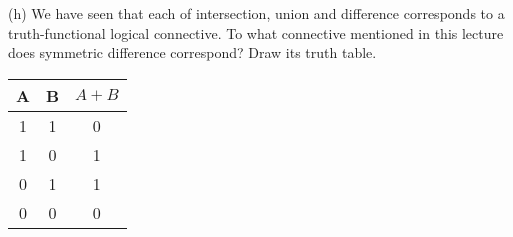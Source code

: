 \documentclass{article}
\begin{document}
(h) We have seen that each of intersection, union and difference corresponds to a truth-functional logical connective. To what connective mentioned in this lecture does symmetric difference correspond? Draw its truth table.
\begin{table}[h!]
    \label{tab:table1}
    \centering
    \begin{tabular}{c|c|c}
        \textbf{A} & \textbf{B} & \textbf{$A+B$}\\
        \hline
        1 & 1 & 0\\
        \hline
        1 & 0 & 1\\
        \hline
        0 & 1 & 1\\
        \hline
        0 & 0 & 0\\
    \end{tabular}
\end{table}
\end{document}
